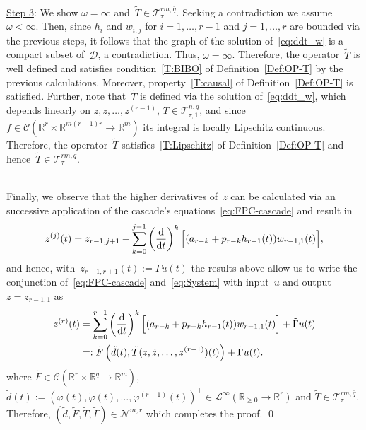 \documentclass[ envcountsect, envcountsame]{svjour3}
\newcommand{\R}{\mathbb{R}}
\newcommand{\cC}{\mathcal{C}}
\newcommand{\cD}{\mathcal{D}}
\newcommand{\cL}{\mathcal{L}}
\newcommand{\cN}{\mathcal{N}}
\newcommand{\cT}{\mathcal{T}}
\newcommand{\vp}{\varphi}
\newcommand{\rp}{\mathbb{R}_{\geq 0}}
\def\red#1{\textcolor[rgb]{0.60,0.10,0.07}{#1}}
\begin{document}
\ \\
\underline{Step 3}: 
We show $\omega = \infty$ and~$\tilde T \in \cT^{rm,\bar q}_\tau$.
Seeking a contradiction we assume~$\omega < \infty$. 
Then, since $h_i$ and $w_{i,j}$ for $i=1,\ldots,r-1$ and $j=1,\ldots,r$ are bounded via the previous steps, it follows that the graph of the solution of~\eqref{eq:ddt_w} is a compact subset of~$\cD$, a contradiction. Thus, ${\omega = \infty}$.
Therefore, the operator~$\tilde T$ is well defined and satisfies condition~\ref{T:BIBO} of Definition~\ref{Def:OP-T} by the previous calculations. 
Moreover, property~\ref{T:causal} of Definition~\ref{Def:OP-T} is satisfied. 
Further, note that~$\tilde T$ is defined via the solution of~\eqref{eq:ddt_w}, which depends linearly on $z,\dot z, \ldots, z^{(r-1)}$, $T \in \cT^{n,q}_{\tau,1}$, 
and since $f \in \cC(\R^r \times \R^{m(r-1)r} \to \R^m)$ its integral is locally Lipschitz continuous.
Therefore, the operator~$\tilde T$ satisfies~\ref{T:Lipschitz} of Definition~\ref{Def:OP-T} and hence~$\tilde T \in \cT^{rm,\bar q}_\tau$.

\ \\
Finally, we observe that the higher derivatives of~$z$ can be calculated via an successive application of the cascade's equations~\eqref{eq:FPC-cascade} and result in
\begin{equation} \label{eq:ddt_j-z}
z^{(j)}(t) = z_{r-1,j+1} + \sum_{k=0}^{j-1}\left( \frac{\text{\normalfont{d}}}{\text{\normalfont{d}} t} \right)^k \Big[ ( a_{r-k} + p_{r-k} h_{r-1}(t)) w_{r-1,1}(t) \Big],
\end{equation}
and hence, with~$z_{r-1,r+1}(t) := \tilde \Gamma u(t)$ the results above allow us to write the conjunction of~\eqref{eq:FPC-cascade} and~\eqref{eq:System} with input~$u$ and output~$z = z_{r-1,1}$ as
\begin{equation} \label{Def:tildeF}
\begin{aligned}
z^{(r)}(t) &= \sum_{k=0}^{r-1} \left( \frac{\text{\normalfont{d}}}{\text{\normalfont{d}} t} \right)^k \Big[ ( a_{r-k} + p_{r-k} h_{r-1}(t)) w_{r-1,1}(t) \Big] + \tilde \Gamma u(t) \\
&=: \tilde F\left( \tilde d(t), \tilde T(z,\dot z,\ldots,z^{(r-1)})(t) \right) + \tilde \Gamma u(t).
\end{aligned}
\end{equation}
where $\tilde F \in \cC(\R^r \times \R^{\bar q} \to \R^m)$,  
$\tilde d(t) := (\vp(t), \dot \vp(t), \ldots , \vp^{(r-1)}(t) )^\top \in \cL^{\infty}(\rp \to \R^r)$ and $\tilde T \in \cT^{rm, \bar q}_\tau$.
Therefore, $(\tilde d, \tilde F, \tilde T, \tilde \Gamma) \in \cN^{m,r}$ 
which completes the proof.
\qed
%
\end{document}
